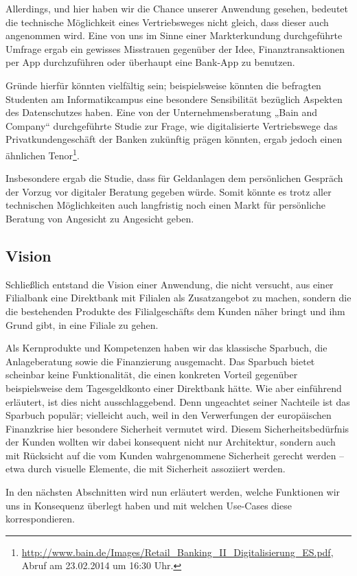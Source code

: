	Allerdings, und hier haben wir die Chance unserer Anwendung gesehen, bedeutet die technische Möglichkeit eines Vertriebsweges nicht gleich, dass dieser auch angenommen wird. Eine von uns im Sinne einer Markterkundung durchgeführte Umfrage ergab ein gewisses Misstrauen gegenüber der Idee, Finanztransaktionen per App durchzuführen oder überhaupt eine Bank-App zu benutzen.
	
	Gründe hierfür könnten vielfältig sein; beispielsweise könnten die befragten Studenten am Informatikcampus eine besondere Sensibilität bezüglich Aspekten des Datenschutzes haben. Eine von der Unternehmensberatung „Bain and Company“ durchgeführte Studie zur Frage, wie digitalisierte Vertriebswege das Privatkundengeschäft der Banken zukünftig prägen könnten, ergab jedoch einen ähnlichen Tenor\footnote{\url{http://www.bain.de/Images/Retail\_Banking\_II\_Digitalisierung\_ES.pdf}, Abruf am 23.02.2014 um 16:30 Uhr.}.

	Insbesondere ergab die Studie, dass für Geldanlagen dem persönlichen Gespräch der Vorzug vor digitaler Beratung gegeben würde. Somit könnte es trotz aller technischen Möglichkeiten auch langfristig noch einen Markt für persönliche Beratung von Angesicht zu Angesicht geben.
 
\subsection{Vision}
	Schließlich entstand die Vision einer Anwendung, die nicht versucht, aus einer Filialbank eine Direktbank mit Filialen als Zusatzangebot zu machen, sondern die die bestehenden Produkte des Filialgeschäfts dem Kunden näher bringt und ihm Grund gibt, in eine Filiale zu gehen. 
	
	Als Kernprodukte und Kompetenzen haben wir das klassische Sparbuch, die Anlageberatung sowie die Finanzierung ausgemacht. Das Sparbuch bietet scheinbar keine Funktionalität, die einen konkreten Vorteil gegenüber beispielsweise dem Tagesgeldkonto einer Direktbank hätte. Wie aber einführend erläutert, ist dies nicht ausschlaggebend. Denn ungeachtet seiner Nachteile ist das Sparbuch populär; vielleicht auch, weil in den Verwerfungen der europäischen Finanzkrise hier besondere Sicherheit vermutet wird. Diesem Sicherheitsbedürfnis der Kunden wollten wir dabei konsequent nicht nur Architektur, sondern auch mit Rücksicht auf die vom Kunden wahrgenommene Sicherheit gerecht werden – etwa durch visuelle Elemente, die mit Sicherheit assoziiert werden.

	In den nächsten Abschnitten wird nun erläutert werden, welche Funktionen wir uns in Konsequenz überlegt haben und mit welchen Use-Cases diese korrespondieren.

